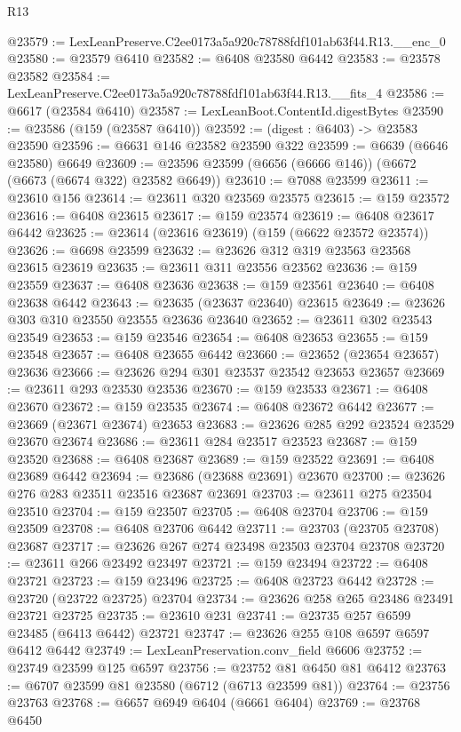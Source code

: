 \begin{lexlean}{R13}
\begin{coremodule}
@23579 := LexLeanPreserve.C2ee0173a5a920c78788fdf101ab63f44.R13.__enc_0
@23580 := @23579 @6410
@23582 := @6408 @23580 @6442
@23583 := @23578 @23582
@23584 := LexLeanPreserve.C2ee0173a5a920c78788fdf101ab63f44.R13.__fits_4
@23586 := @6617 (@23584 @6410)
@23587 := LexLeanBoot.ContentId.digestBytes
@23590 := @23586 (@159 (@23587 @6410))
@23592 := (digest : @6403) -> @23583 @23590
@23596 := @6631 @146 @23582 @23590 @322
@23599 := @6639 (@6646 @23580) @6649
@23609 := @23596 @23599 (@6656 (@6666 @146)) (@6672 (@6673 (@6674 @322) @23582 @6649))
@23610 := @7088 @23599
@23611 := @23610 @156
@23614 := @23611 @320 @23569 @23575
@23615 := @159 @23572
@23616 := @6408 @23615
@23617 := @159 @23574
@23619 := @6408 @23617 @6442
@23625 := @23614 (@23616 @23619) (@159 (@6622 @23572 @23574))
@23626 := @6698 @23599
@23632 := @23626 @312 @319 @23563 @23568 @23615 @23619
@23635 := @23611 @311 @23556 @23562
@23636 := @159 @23559
@23637 := @6408 @23636
@23638 := @159 @23561
@23640 := @6408 @23638 @6442
@23643 := @23635 (@23637 @23640) @23615
@23649 := @23626 @303 @310 @23550 @23555 @23636 @23640
@23652 := @23611 @302 @23543 @23549
@23653 := @159 @23546
@23654 := @6408 @23653
@23655 := @159 @23548
@23657 := @6408 @23655 @6442
@23660 := @23652 (@23654 @23657) @23636
@23666 := @23626 @294 @301 @23537 @23542 @23653 @23657
@23669 := @23611 @293 @23530 @23536
@23670 := @159 @23533
@23671 := @6408 @23670
@23672 := @159 @23535
@23674 := @6408 @23672 @6442
@23677 := @23669 (@23671 @23674) @23653
@23683 := @23626 @285 @292 @23524 @23529 @23670 @23674
@23686 := @23611 @284 @23517 @23523
@23687 := @159 @23520
@23688 := @6408 @23687
@23689 := @159 @23522
@23691 := @6408 @23689 @6442
@23694 := @23686 (@23688 @23691) @23670
@23700 := @23626 @276 @283 @23511 @23516 @23687 @23691
@23703 := @23611 @275 @23504 @23510
@23704 := @159 @23507
@23705 := @6408 @23704
@23706 := @159 @23509
@23708 := @6408 @23706 @6442
@23711 := @23703 (@23705 @23708) @23687
@23717 := @23626 @267 @274 @23498 @23503 @23704 @23708
@23720 := @23611 @266 @23492 @23497
@23721 := @159 @23494
@23722 := @6408 @23721
@23723 := @159 @23496
@23725 := @6408 @23723 @6442
@23728 := @23720 (@23722 @23725) @23704
@23734 := @23626 @258 @265 @23486 @23491 @23721 @23725
@23735 := @23610 @231
@23741 := @23735 @257 @6599 @23485 (@6413 @6442) @23721
@23747 := @23626 @255 @108 @6597 @6597 @6412 @6442
@23749 := LexLeanPreservation.conv_field @6606
@23752 := @23749 @23599 @125 @6597
@23756 := @23752 @81 @6450 @81 @6412
@23763 := @6707 @23599 @81 @23580 (@6712 (@6713 @23599 @81))
@23764 := @23756 @23763
@23768 := @6657 @6949 @6404 (@6661 @6404)
@23769 := @23768 @6450

\end{coremodule}
\end{lexlean}
